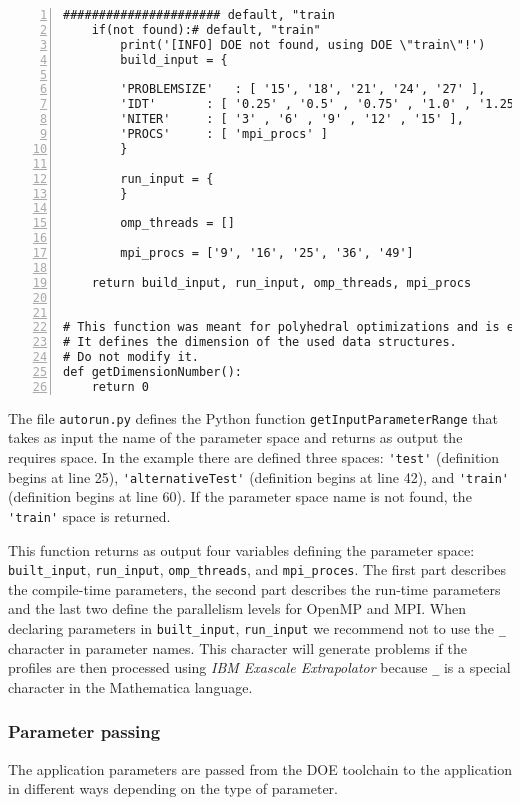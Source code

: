 \documentclass[a4paper, 10pt]{article}
\begin{document}
\begin{Verbatim}[obeytabs, tabsize=4, frame=lines, numbers=left]
	###################### default, "train
	if(not found):# default, "train"
		print('[INFO] DOE not found, using DOE \"train\"!')
		build_input = {

		'PROBLEMSIZE' 	: [ '15', '18', '21', '24', '27' ], 
		'IDT'		: [ '0.25' , '0.5' , '0.75' , '1.0' , '1.25' ],
		'NITER'		: [ '3' , '6' , '9' , '12' , '15' ],
		'PROCS'		: [ 'mpi_procs' ] 
		}

		run_input = {
		}

		omp_threads = [] 

		mpi_procs = ['9', '16', '25', '36', '49'] 
		
	return build_input, run_input, omp_threads, mpi_procs

	
# This function was meant for polyhedral optimizations and is experimental.
# It defines the dimension of the used data structures.
# Do not modify it.
def getDimensionNumber():
	return 0
\end{Verbatim}

The file \verb!autorun.py! defines the Python function \verb!getInputParameterRange!
that takes as input the name of the parameter space and returns as output the requires space.
In the example there are defined three spaces: \verb!'test'! (definition begins at line 25),
\verb!'alternativeTest'! (definition begins at line 42), and \verb!'train'! (definition begins at line 60).
If the parameter space name is not found,
the \verb!'train'! space is returned.

This function returns as output four variables defining the parameter space: \verb!built_input!, \verb!run_input!, \verb!omp_threads!, and \verb!mpi_proces!.
The first part describes the compile-time parameters, the second part describes the run-time parameters
and the last two define the parallelism levels for OpenMP and MPI. When declaring parameters in 
\verb!built_input!, \verb!run_input! we recommend not to use the \verb!_! character in parameter names.
This character will generate problems if the profiles are then processed using \textit{IBM Exascale Extrapolator} because
\verb!_! is a special character in the Mathematica language.

\subsubsection{Parameter passing}
\label{sec:parameterPassing}

The application parameters are passed from the DOE toolchain to the application in different ways depending on the type of parameter.
\end{document}
